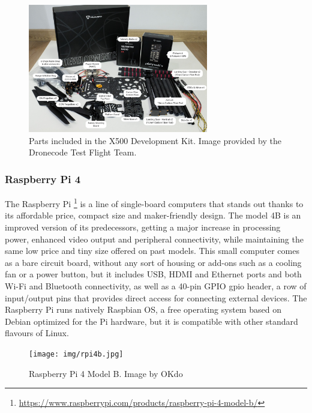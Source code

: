 \begin{figure}
  \centering
  \includegraphics[width=0.7\textwidth,keepaspectratio]{img/x500-dev-kit.jpg}
  \caption{Parts included in the X500 Development Kit. Image provided by the Dronecode Test Flight Team.}\label{fig:x500}
\end{figure}

\subsubsection{Raspberry Pi 4}
\label{subsec:rpi}
The Raspberry Pi \footnote{\url{https://www.raspberrypi.com/products/raspberry-pi-4-model-b/}} is a line of single-board computers that stands out thanks to its affordable price,
compact size and maker-friendly design. The model 4B is an improved version of its predecessors,
getting a major increase in processing power, enhanced video output and peripheral connectivity,
while maintaining the same low price and tiny size offered on past models.
This small computer comes as a bare circuit board,
without any sort of housing or add-ons such as a cooling fan or a power button,
but it includes USB, HDMI and Ethernet ports and both Wi-Fi and Bluetooth connectivity,
as well as a 40-pin GPIO \gls{gpio} header, a row of input/output pins that provides direct access for connecting external devices.
The Raspberry Pi runs natively Raspbian OS, a free operating system based on Debian optimized for the Pi hardware, but it is compatible with other standard flavours of Linux.

\begin{figure}
  \centering
  \texttt{[image: img/rpi4b.jpg]}
  \caption{Raspberry Pi 4 Model B. Image by OKdo}\label{fig:rpi4b}
\end{figure}
